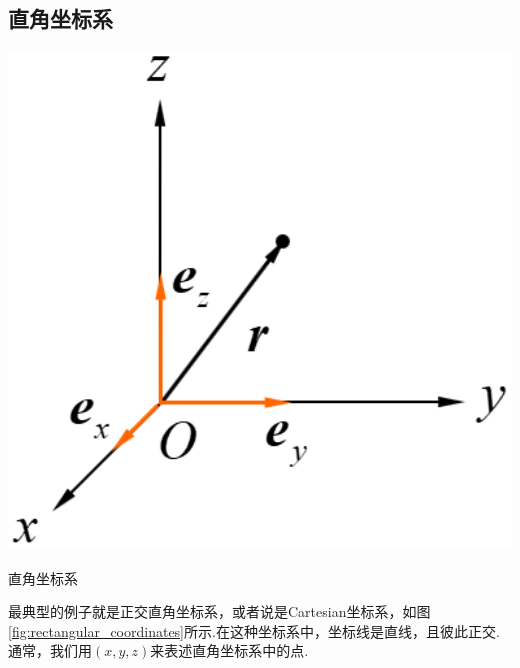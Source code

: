 	\subsection{直角坐标系}
		\begin{marginfigure}
			\centering
			\includegraphics[width=1\textwidth]{figures/rectangular_coordinates.png}
			\caption{直角坐标系}\label{fig:rectangular_coordinates}
		\end{marginfigure}
	最典型的例子就是正交直角坐标系，或者说是Cartesian坐标系，如图\ref{fig:rectangular_coordinates}所示.在这种坐标系中，坐标线是直线，且彼此正交.通常，我们用$(x,y,z)$来表述直角坐标系中的点.
